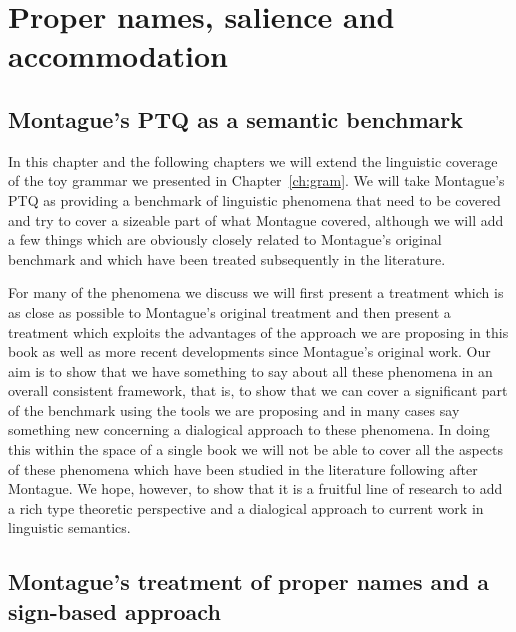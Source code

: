 \chapter{Proper names, salience and accommodation}
\label{ch:propnames}
\setcounter{examplectr}{0}

\section{Montague's PTQ as a semantic benchmark}

In this chapter and the following chapters we will extend the linguistic coverage of the toy
grammar we presented in Chapter~\ref{ch:gram}.  We will take
Montague's PTQ \citep{Montague1973,Montague1974} as providing a benchmark of linguistic phenomena that
need to be covered and try to cover a sizeable part of what Montague covered, although we will add a few things which are
obviously closely related to Montague's original benchmark and which
have been treated subsequently in the literature.

For many of the phenomena we discuss we will first present a treatment
which is as close as possible to Montague's original treatment and
then present a treatment which exploits the advantages of the approach
we are proposing in this book as well as more recent developments
since Montague's original work.  Our aim is to show that we have
something to say about all these phenomena in an overall consistent
framework, that is, to show that we can cover a significant part of the benchmark using the
tools we are proposing and in many cases say something new concerning
a dialogical approach to these phenomena.  In doing this within the
space of a single book we will not be able to cover all the aspects of
these phenomena which have been studied in the literature following
after Montague.  We hope, however, to show that it is a fruitful line
of research to add a rich type theoretic perspective and a dialogical
approach to current work in linguistic semantics.   
 



\section{Montague's treatment of proper names and a sign-based approach}

